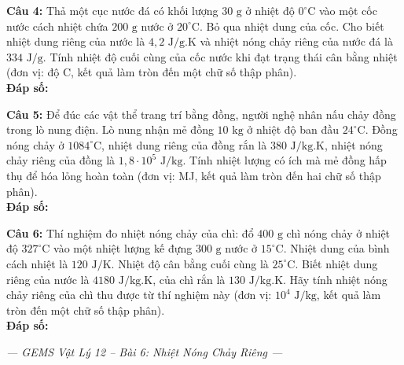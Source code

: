 \documentclass[12pt,a4paper]{article}
\begin{document}
\textbf{Câu 4:} Thả một cục nước đá có khối lượng $30\text{ g}$ ở nhiệt độ $0^{\circ}\text{C}$ vào một cốc nước cách nhiệt chứa $200\text{ g}$ nước ở $20^{\circ}\text{C}$. Bỏ qua nhiệt dung của cốc. Cho biết nhiệt dung riêng của nước là $4{,}2\text{ J/g.K}$ và nhiệt nóng chảy riêng của nước đá là $334\text{ J/g}$. Tính nhiệt độ cuối cùng của cốc nước khi đạt trạng thái cân bằng nhiệt (đơn vị: độ C, kết quả làm tròn đến một chữ số thập phân).\\
\textbf{Đáp số:} \dotfill

\textbf{Câu 5:} Để đúc các vật thể trang trí bằng đồng, người nghệ nhân nấu chảy đồng trong lò nung điện. Lò nung nhận mẻ đồng $10\text{ kg}$ ở nhiệt độ ban đầu $24^{\circ}\text{C}$. Đồng nóng chảy ở $1084^{\circ}\text{C}$, nhiệt dung riêng của đồng rắn là $380\text{ J/kg.K}$, nhiệt nóng chảy riêng của đồng là $1{,}8 \cdot 10^5\text{ J/kg}$. Tính nhiệt lượng có ích mà mẻ đồng hấp thụ để hóa lỏng hoàn toàn (đơn vị: MJ, kết quả làm tròn đến hai chữ số thập phân).\\
\textbf{Đáp số:} \dotfill

\textbf{Câu 6:} Thí nghiệm đo nhiệt nóng chảy của chì: đổ $400\text{ g}$ chì nóng chảy ở nhiệt độ $327^{\circ}\text{C}$ vào một nhiệt lượng kế đựng $300\text{ g}$ nước ở $15^{\circ}\text{C}$. Nhiệt dung của bình cách nhiệt là $120\text{ J/K}$. Nhiệt độ cân bằng cuối cùng là $25^{\circ}\text{C}$. Biết nhiệt dung riêng của nước là $4180\text{ J/kg.K}$, của chì rắn là $130\text{ J/kg.K}$. Hãy tính nhiệt nóng chảy riêng của chì thu được từ thí nghiệm này (đơn vị: $10^4\text{ J/kg}$, kết quả làm tròn đến một chữ số thập phân).\\
\textbf{Đáp số:} \dotfill

\vfill
\begin{center}
\textit{--- GEMS Vật Lý 12 -- Bài 6: Nhiệt Nóng Chảy Riêng ---}
\end{center}
\end{document}
